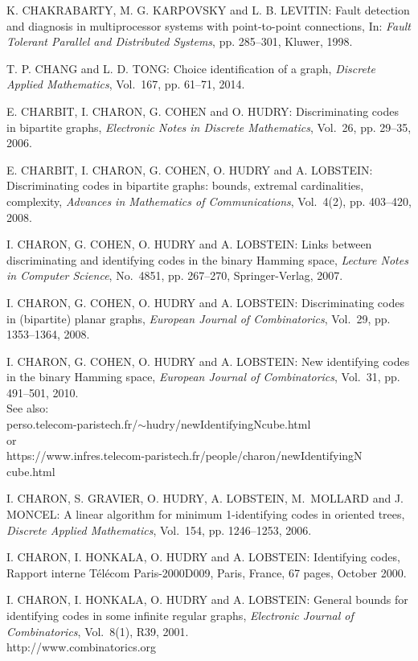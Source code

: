 \begin{thebibliography}{999}
K. CHAKRABARTY, M. G. KARPOVSKY and L. B. LEVITIN: Fault detection and diagnosis in multiprocessor systems with point-to-point connections, In: {\it Fault Tolerant Parallel and Distributed Systems}, pp. 285--301, Kluwer, 1998. 

T. P. CHANG and L. D. TONG: Choice identification of a graph, {\it Discrete Applied Mathematics}, Vol.~167, pp. 61--71, 2014.

E. CHARBIT, I. CHARON, G. COHEN and O. HUDRY: Discriminating codes in bipartite graphs, {\it Electronic Notes in Discrete Mathematics}, Vol.~26, pp. 29--35, 2006.

E. CHARBIT, I. CHARON, G. COHEN, O. HUDRY and A. LOBSTEIN: Discriminating codes in bipartite graphs: bounds, extremal cardinalities, complexity, {\it Advances in Mathematics of Communications}, Vol.~4(2), pp. 403--420, 2008.

I. CHARON, G. COHEN, O. HUDRY and A. LOBSTEIN: Links between discriminating and identifying codes in the binary Hamming space, {\it Lecture Notes in Computer Science}, No.~4851, pp. 267--270, Springer-Verlag, 2007.

I. CHARON, G. COHEN, O. HUDRY and A. LOBSTEIN: Discriminating codes in (bipartite) planar graphs, {\it European Journal of Combinatorics}, Vol.~29, pp. 1353--1364, 2008.

  I. CHARON, G. COHEN, O. HUDRY and A. LOBSTEIN: New identifying codes in the binary Hamming space, {\it European Journal of Combinatorics}, Vol.~31, pp. 491--501, 2010.\\
See also: \\perso.telecom-paristech.fr/$\sim$hudry/newIdentifyingNcube.html\\or\\
https://www.infres.telecom-paristech.fr/people/charon/newIdentifyingN cube.html

I. CHARON, S. GRAVIER, O. HUDRY, A. LOBSTEIN, M.~MOLLARD and J. MONCEL: A linear algorithm for minimum 1-identifying codes in oriented trees, {\it Discrete Applied Mathematics}, Vol.~154, pp. 1246--1253, 2006.

I. CHARON, I. HONKALA, O. HUDRY and A. LOBSTEIN: Identifying codes, Rapport interne T\'el\'ecom Paris-2000D009, Paris, France, 67 pages, October 2000.

I. CHARON, I. HONKALA, O. HUDRY and A. LOBSTEIN: General bounds for identifying codes in some infinite regular graphs, {\it Electronic Journal of Combinatorics}, Vol.~8(1), R39, 2001.\\
http://www.combinatorics.org


\end{thebibliography}
